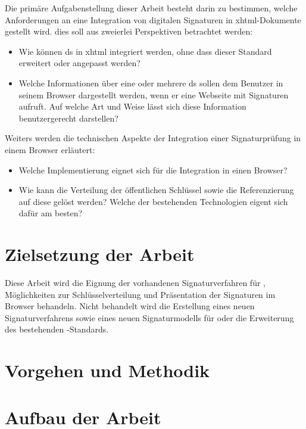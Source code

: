 Die primäre Aufgabenstellung dieser Arbeit besteht darin zu bestimmen, welche Anforderungen an eine Integration von digitalen Signaturen in \gls{xhtml}-Dokumente gestellt wird. dies soll aus zweierlei Perspektiven betrachtet werden:
\begin{itemize}
    \item Wie können \Gls{ds} in \gls{xhtml} integriert werden, ohne dass dieser Standard erweitert oder angepasst werden?
    \item Welche Informationen über eine oder mehrere \gls{ds} sollen dem Benutzer in seinem Browser dargestellt werden, wenn er eine Webseite mit Signaturen aufruft. Auf welche Art und Weise lässt sich diese Information benutzergerecht darstellen?
\end{itemize}
Weiters werden die technischen Aspekte der Integration einer Signaturprüfung in einem Browser erläutert:
\begin{itemize}
    \item Welche Implementierung eignet sich für die Integration in einen Browser?
    \item Wie kann die Verteilung der öffentlichen Schlüssel sowie die Referenzierung auf diese gelöst werden? Welche der bestehenden Technologien eigent sich dafür am besten?
\end{itemize}

\section{Zielsetzung der Arbeit}
%
\label{sec:einl:ziele}%
Diese Arbeit wird die Eignung der vorhandenen Signaturverfahren für , Möglichkeiten zur Schlüsselverteilung und Präsentation der Signaturen im Browser behandeln.
Nicht behandelt wird die Erstellung eines neuen Signaturverfahrens sowie eines neuen Signaturmodells für  oder die Erweiterung des bestehenden -Standards.

\section{Vorgehen und Methodik}
%
\label{sec:einl:methodik}%


\section{Aufbau der Arbeit}
%
\label{sec:einl:aufbau}%
